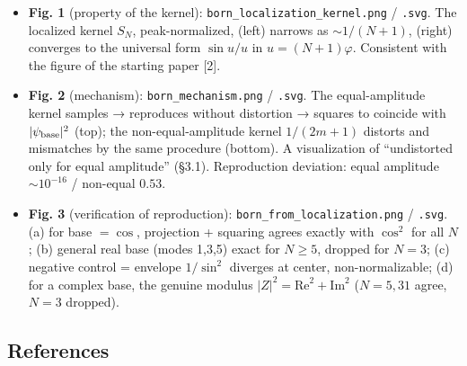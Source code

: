 \documentclass[
]{ltjsarticle}
\providecommand{\tightlist}{%
  \setlength{\itemsep}{0pt}\setlength{\parskip}{0pt}}
\begin{document}
\begin{itemize}
\tightlist
\item
  \textbf{Fig. 1} (property of the kernel):
  \texttt{born\_localization\_kernel.png} / \texttt{.svg}. The localized
  kernel \(S_N\), peak-normalized, (left) narrows as \(\sim1/(N+1)\),
  (right) converges to the universal form \(\sin u/u\) in
  \(u=(N+1)\varphi\). Consistent with the figure of the starting paper
  {[}2{]}.
\item
  \textbf{Fig. 2} (mechanism): \texttt{born\_mechanism.png} /
  \texttt{.svg}. The equal-amplitude kernel samples → reproduces without
  distortion → squares to coincide with \(|\psi_{\rm base}|^2\) (top);
  the non-equal-amplitude kernel \(1/(2m+1)\) distorts and mismatches by
  the same procedure (bottom). A visualization of ``undistorted only for
  equal amplitude'' (§3.1). Reproduction deviation: equal amplitude
  \(\sim10^{-16}\) / non-equal \(0.53\).
\item
  \textbf{Fig. 3} (verification of reproduction):
  \texttt{born\_from\_localization.png} / \texttt{.svg}. (a) for base
  \(=\cos\), projection + squaring agrees exactly with \(\cos^2\) for
  all \(N\); (b) general real base (modes 1,3,5) exact for \(N\ge5\),
  dropped for \(N=3\); (c) negative control = envelope \(1/\sin^2\)
  diverges at center, non-normalizable; (d) for a complex base, the
  genuine modulus \(|Z|^2=\mathrm{Re}^2+\mathrm{Im}^2\) (\(N=5,31\)
  agree, \(N=3\) dropped).
\end{itemize}

\subsection{References}\label{references}
\end{document}
